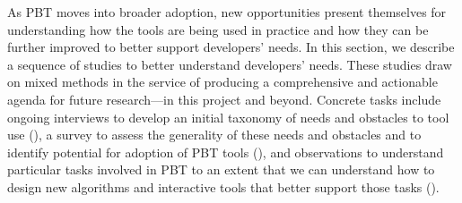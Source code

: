 





\label{sec:foundation}


As PBT moves into broader adoption, new opportunities present
themselves for understanding how
the tools are being used in practice and how they can be further
improved to better support developers' needs. In this section, we describe a
sequence of studies to better understand developers' needs.
These studies draw on mixed methods in the service of producing a
comprehensive and actionable agenda for future research---in this
project and beyond.  Concrete tasks include ongoing interviews to
develop an initial taxonomy of needs and
obstacles to tool use (), a survey to assess the
generality of these needs and obstacles and to identify potential for adoption
of PBT tools (), and observations to understand
particular tasks involved in PBT to an extent that we can understand how to
design new algorithms and interactive tools that better support those tasks
().

